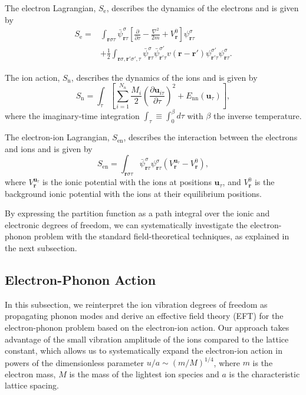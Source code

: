 \documentclass[%
 reprint,
superscriptaddress,
 amsmath,amssymb,
 aps,
prx,
]{revtex4-2}
\newcommand{\br}{\mathbf{r}}
\newcommand{\bu}{\mathbf{u}}
\newcommand{\txe}{\text{e}}
\newcommand{\txn}{\text{n}}
\newcommand{\txen}{\text{en}}
\newcommand{\txnn}{\text{nn}}
\begin{document}
\begin{appendices}
The electron Lagrangian, $S_\txe$, describes the dynamics of the electrons and is given by 
\begin{align}
\label{eq:electron_model}
    S_{\txe} =& \int_{\br\sigma\tau} \bar{\psi}_{\br\tau}^{\sigma}\left[\frac{\partial}{\partial \tau} -\frac{\nabla^2}{2m} +V^0_\br \right]\psi_{\br\tau}^{\sigma}\nonumber\\
            &+\frac{1}{2}\int_{\br\sigma,\br'\sigma',\tau}\bar{\psi}_{\br\tau}^{\sigma}\bar{\psi}_{\br'\tau}^{\sigma'} v(\br-\br')\psi_{\br'\tau}^{\sigma'} \psi_{\br\tau}^{\sigma}.   
\end{align}

The ion action, $S_\txn$, describes the dynamics of the ions and is given by
\begin{equation}
    S_{\txn} = \int_\tau \left[\sum_{i=1}^{N_n}\frac{M_i}{2}\left(\frac{\partial \bu_{i\tau}}{\partial\tau}\right)^2 + E_{\txnn}\left(\bu_\tau\right)\right],
\end{equation}
where the imaginary-time integration $\int_\tau \equiv \int_0^\beta d\tau$ with $\beta$ the inverse temperature.

The electron-ion Lagrangian, $S_{\txen}$, describes the interaction between the electrons and ions and is given by
\begin{equation}
\label{eq:en_action}
    S_{\txen} = \int_{\br\sigma\tau} \bar{\psi}_{\br\tau}^{\sigma}\psi_{\br\tau}^{\sigma} \left(V^{\bu_\tau}_{\br} -V^0_{ \br}\right),
\end{equation}
where $V^{\bu_\tau}_{\br}$ is the ionic potential with the ions at positions $\bu_\tau$, and $V^0_{ \br}$ is the background ionic potential with the ions at their equilibrium positions.

By expressing the partition function as a path integral over the ionic and electronic degrees of freedom, we can systematically investigate the electron-phonon problem with the standard field-theoretical techniques, as explained in the next subsection.




\subsection{Electron-Phonon Action}

In this subsection, we reinterpret the ion vibration degrees of freedom as propagating phonon modes and derive an effective field theory (EFT) for the electron-phonon problem based on the electron-ion action. Our approach takes advantage of the small vibration amplitude of the ions compared to the lattice constant, which allows us to systematically expand the electron-ion action in powers of the dimensionless parameter $u/a \sim \left(m/M\right)^{1/4}$, where $m$ is the electron mass, $M$ is the mass of the lightest ion species and $a$ is the characteristic lattice spacing.



\end{appendices}
\end{document}
